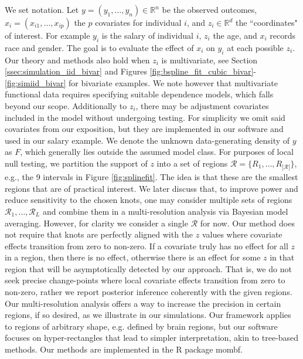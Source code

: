 We set notation. Let $y = (y_1, \ldots, y_n) \in \mathbb{R}^n$ be the observed outcomes,
$x_i= (x_{i1},\ldots,x_{ip})$ the $p$ covariates for individual $i$, and $z_i \in \mathbb{R}^d$ the ``coordinates" of interest. %
For example $y_i$ is the salary of individual $i$, $z_i$ the age, and $x_i$ records race and gender.
The goal is to evaluate the effect of $x_i$ on $y_i$ at each possible $z_i$. 
Our theory and methods also hold when $z_i$ is multivariate,  see Section \ref{ssec:simulation_iid_bivar} and Figures \ref{fig:bspline_fit_cubic_bivar}-\ref{fig:simiid_bivar} for bivariate examples.
We note however that multivariate functional data requires
specifying suitable dependence models, which falls beyond our scope.  %
Additionally to $z_i$, there may be adjustment covariates included in the model without undergoing testing. For simplicity we omit said covariates from our exposition, but they are implemented in our software and used in our salary example. 
We denote the unknown data-generating density of $y$ as $F$, which generally lies outside the assumed model class. For purposes of local null testing, we partition the support of $z$ into a set of regions $\mathcal{R}= \{R_1,\ldots,R_{|\mathcal{R}|}\}$, e.g., the 9 intervals in Figure \ref{fig:splinefit}. 
The idea is that these are the smallest regions that are of practical interest. We later discuss that, to improve power  and reduce sensitivity to the chosen knots,  one may consider multiple sets of regions $\mathcal{R}_1,\ldots,\mathcal{R}_L$ and combine them in a multi-resolution analysis via Bayesian model averaging. 
However, for clarity we consider a single $\mathcal{R}$ for now.
Our method does not require that knots are perfectly aligned with the $z$ values where covariate effects transition from zero to non-zero. If a covariate truly has no effect for all $z$ in a region, then there is no effect, otherwise there is an effect for some $z$ in that region that will be asymptotically detected by our approach. That is, we do not seek precise change-points where local covariate effects transition from zero to non-zero, rather we report posterior inference coherently with the given regions.
Our multi-resolution analysis offers a way to increase the precision in certain regions, if so desired, as we illustrate in our simulations. Our framework applies to regions of arbitrary shape, e.g. defined by brain regions, but our software focuses on hyper-rectangles that lead to simpler interpretation, akin to tree-based methods. 
Our methods are implemented in the R package mombf.

